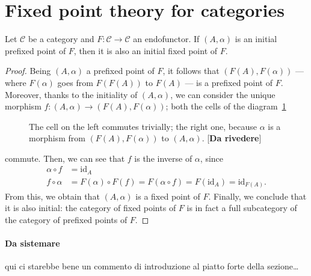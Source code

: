 \section{Fixed point theory for categories}

\begin{lem}
  Let \(\mathcal{C}\) be a category and \(F \colon \mathcal{C} \to \mathcal{C}\) an endofunctor.
  If \((A,\alpha)\) is an initial prefixed point of \(F\), then it is also an initial fixed point of \(F\).
\end{lem}
\begin{proof}
  Being \((A,\alpha)\) a prefixed point of \(F\), it follows that \((F(A),F(\alpha))\) --- where \(F(\alpha)\) goes from \(F(F(A))\) to \(F(A)\) --- is a prefixed point of \(F\).
  Moreover, thanks to the initiality of \((A,\alpha)\), we can consider the unique morphism \(f \colon (A,\alpha) \to (F(A),F(\alpha))\); both the cells of the diagram~\ref{02:diagram-1}
  \begin{figure}[!ht]
    \begin{center}
    \end{center}
    \caption{The cell on the left commutes trivially; the right one, because \(\alpha\) is a morphism from \((F(A),F(\alpha))\) to \((A,\alpha)\). [\textbf{Da rivedere}]}
    \label{02:diagram-1}
  \end{figure}
  commute.
  Then, we can see that \(f\) is the inverse of \(\alpha\), since
  \begin{align}
    \alpha \circ f &= \mathrm{id}_A \\
    f \circ \alpha &= F(\alpha) \circ F(f) = F (\alpha \circ f) = F(\mathrm{id}_A) = \mathrm{id}_{F(A)}.
  \end{align}
  From this, we obtain that \((A,\alpha)\) is a fixed point of \(F\).
  Finally, we conclude that it is also initial: the category of fixed points of \(F\) is in fact a full subcategory of the category of prefixed points of \(F\).
\end{proof}

\paragraph{Da sistemare} qui ci starebbe bene un commento di introduzione al piatto forte della sezione\dots

